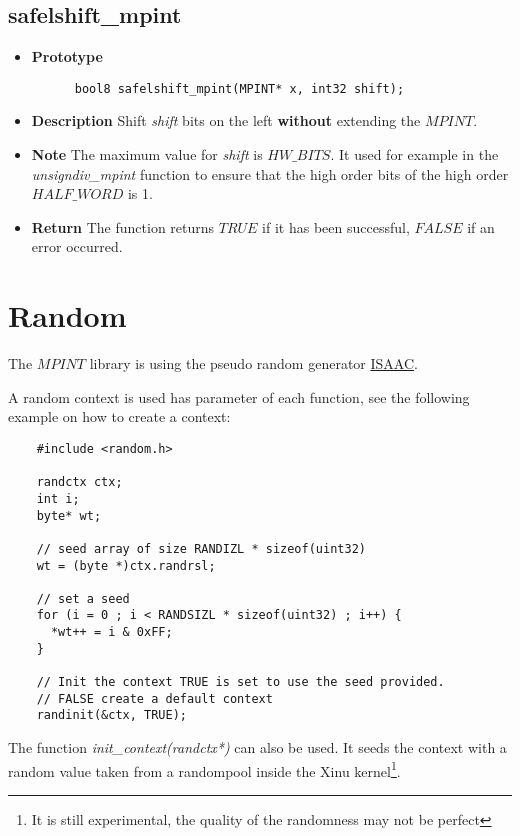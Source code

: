\documentclass[10pt,a4paper]{article}
\begin{document}
  \subsection{safelshift\_mpint}
  
  \begin{itemize}
    \item [] \textbf{Prototype}
    \begin{lstlisting}
      bool8 safelshift_mpint(MPINT* x, int32 shift);
    \end{lstlisting}
    \item [] \textbf{Description} Shift \textit{shift} bits on the left \textbf{without} extending the $MPINT$.
    \item [] \textbf{Note} The maximum value for \textit{shift} is $HW\_BITS$. It used for example in the \textit{unsigndiv\_mpint} function to ensure that the
    high order bits of the high order $HALF\_WORD$ is 1.
    \item [] \textbf{Return} The function returns $TRUE$ if it has been successful, $FALSE$ if an error occurred.
  \end{itemize}
  
  \section{Random}
  
  The $MPINT$ library is using the pseudo random generator \href{http://burtleburtle.net/bob/rand/isaacafa.html}{ISAAC}.
  
  A random context is used has parameter of each function, see the following example on how to create a context:
  
  \begin{lstlisting}
    #include <random.h>
    
    randctx ctx;
    int i;
    byte* wt;
    
    // seed array of size RANDIZL * sizeof(uint32)
    wt = (byte *)ctx.randrsl;
    
    // set a seed
    for (i = 0 ; i < RANDSIZL * sizeof(uint32) ; i++) {
      *wt++ = i & 0xFF;
    }
    
    // Init the context TRUE is set to use the seed provided.
    // FALSE create a default context
    randinit(&ctx, TRUE);
  \end{lstlisting}
  
  The function \textit{init\_context(randctx*)} can also be used. It seeds the context with a random value taken from a randompool inside the Xinu kernel\footnote{It is still experimental,
    the quality of the randomness may not be perfect}.
  
\end{document}
